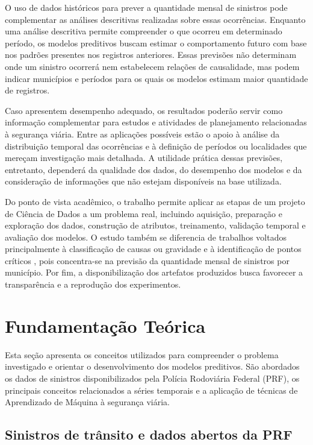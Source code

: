\documentclass[12pt]{article}
\begin{document}
O uso de dados históricos para prever a quantidade mensal de sinistros pode complementar as análises descritivas realizadas sobre essas ocorrências. Enquanto uma análise descritiva permite compreender o que ocorreu em determinado período, os modelos preditivos buscam estimar o comportamento futuro com base nos padrões presentes nos registros anteriores. Essas previsões não determinam onde um sinistro ocorrerá nem estabelecem relações de causalidade, mas podem indicar municípios e períodos para os quais os modelos estimam maior quantidade de registros.

Caso apresentem desempenho adequado, os resultados poderão servir como informação complementar para estudos e atividades de planejamento relacionadas à segurança viária. Entre as aplicações possíveis estão o apoio à análise da distribuição temporal das ocorrências e à definição de períodos ou localidades que mereçam investigação mais detalhada. A utilidade prática dessas previsões, entretanto, dependerá da qualidade dos dados, do desempenho dos modelos e da consideração de informações que não estejam disponíveis na base utilizada.

Do ponto de vista acadêmico, o trabalho permite aplicar as etapas de um projeto de Ciência de Dados a um problema real, incluindo aquisição, preparação e exploração dos dados, construção de atributos, treinamento, validação temporal e avaliação dos modelos. O estudo também se diferencia de trabalhos voltados principalmente à classificação de causas ou gravidade \cite{silva2024classificacao,mafort2025tecnicas} e à identificação de pontos críticos \cite{santos2021machine}, pois concentra-se na previsão da quantidade mensal de sinistros por município. Por fim, a disponibilização dos artefatos produzidos busca favorecer a transparência e a reprodução dos experimentos.

\section{Fundamentação Teórica}

Esta seção apresenta os conceitos utilizados para compreender o problema investigado e orientar o desenvolvimento dos modelos preditivos. São abordados os dados de sinistros disponibilizados pela Polícia Rodoviária Federal (PRF), os principais conceitos relacionados a séries temporais e a aplicação de técnicas de Aprendizado de Máquina à segurança viária.

\subsection{Sinistros de trânsito e dados abertos da PRF}
\end{document}
